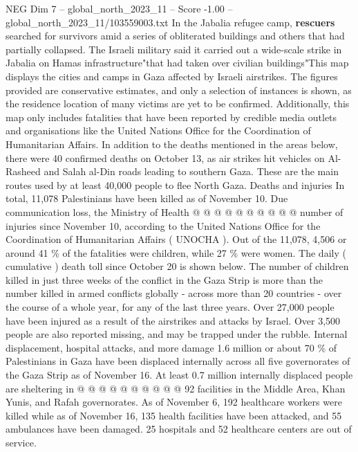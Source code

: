\begin{textsample}{NEG Dim 7 – global\_north\_2023\_11 – Score -1.00 – global\_north\_2023\_11/103559003.txt}  \label{ex:f7_neg_327}
In the Jabalia refugee camp, \textbf{rescuers} searched for survivors amid a series of obliterated buildings and others that had partially collapsed.
The Israeli military said it carried out a wide-scale strike in Jabalia on Hamas infrastructure"that had taken over civilian buildings"This map displays the cities and camps in Gaza affected by Israeli airstrikes.
The figures provided are conservative estimates, and only a selection of instances is shown, as the residence location of many victims are yet to be confirmed.
Additionally, this map only includes fatalities that have been reported by credible media outlets and organisations like the United Nations Office for the Coordination of Humanitarian Affairs.
In addition to the deaths mentioned in the areas below, there were 40 confirmed deaths on October 13, as air strikes hit vehicles on Al-Rasheed and Salah al-Din roads leading to southern Gaza.
These are the main routes used by at least 40,000 people to flee North Gaza.
Deaths and injuries In total, 11,078 Palestinians have been killed as of November 10.
Due communication loss, the Ministry of Health @ @ @ @ @ @ @ @ @ @ number of injuries since November 10, according to the United Nations Office for the Coordination of Humanitarian Affairs ( UNOCHA ).
Out of the 11,078, 4,506 or around 41 \% of the fatalities were children, while 27 \% were women.
The daily ( cumulative ) death toll since October 20 is shown below.
The number of children killed in just three weeks of the conflict in the Gaza Strip is more than the number killed in armed conflicts globally - across more than 20 countries - over the course of a whole year, for any of the last three years.
Over 27,000 people have been injured as a result of the airstrikes and attacks by Israel.
Over 3,500 people are also reported missing, and may be trapped under the rubble.
Internal displacement, hospital attacks, and more damage 1.6 million or about 70 \% of Palestinians in Gaza have been displaced internally across all five governorates of the Gaza Strip as of November 16.
At least 0.7 million internally displaced people are sheltering in @ @ @ @ @ @ @ @ @ @ 92 facilities in the Middle Area, Khan Yunis, and Rafah governorates.
As of November 6, 192 healthcare workers were killed while as of November 16, 135 health facilities have been attacked, and 55 ambulances have been damaged. 25 hospitals and 52 healthcare centers are out of service.

\end{textsample}
